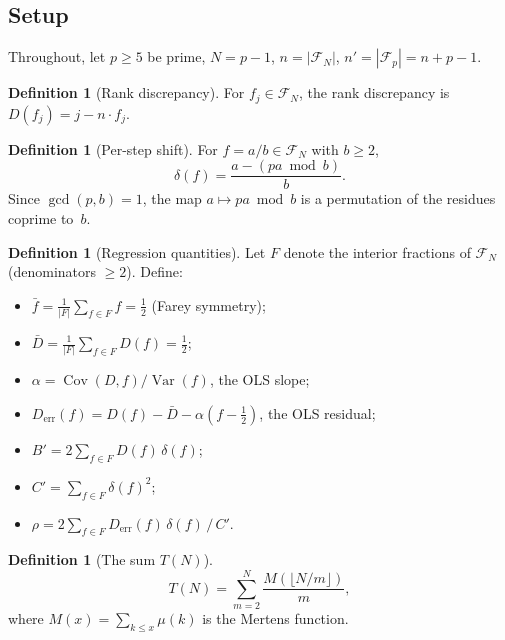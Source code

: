 \documentclass[11pt]{article}
\theoremstyle{definition}
\newtheorem{definition}[theorem]{Definition}
\newcommand{\F}{\mathcal{F}}
\DeclareMathOperator{\Cov}{Cov}
\DeclareMathOperator{\Var}{Var}
\begin{document}
\subsection{Setup}

Throughout, let $p \ge 5$ be prime, $N = p - 1$, $n = |\F_N|$,
$n' = |\F_p| = n + p - 1$.

\begin{definition}[Rank discrepancy]
For $f_j \in \F_N$, the rank discrepancy is
$D(f_j) = j - n \cdot f_j$.
\end{definition}

\begin{definition}[Per-step shift]
For $f = a/b \in \F_{N}$ with $b \ge 2$,
\begin{equation}\label{eq:shift}
  \delta(f) = \frac{a - (pa \bmod b)}{b}.
\end{equation}
Since $\gcd(p,b) = 1$, the map $a \mapsto pa \bmod b$ is a
permutation of the residues coprime to~$b$.
\end{definition}

\begin{definition}[Regression quantities]
Let $F$ denote the interior fractions of $\F_N$ (denominators $\ge 2$).
Define:
\begin{itemize}
  \item $\bar{f} = \frac{1}{|F|}\sum_{f \in F} f = \frac{1}{2}$
    (Farey symmetry);
  \item $\bar{D} = \frac{1}{|F|}\sum_{f \in F} D(f) = \frac{1}{2}$;
  \item $\alpha = \Cov(D, f)/\Var(f)$, the OLS slope;
  \item $D_{\mathrm{err}}(f) = D(f) - \bar{D} - \alpha(f - \tfrac{1}{2})$,
    the OLS residual;
  \item $B' = 2\sum_{f \in F} D(f)\,\delta(f)$;
  \item $C' = \sum_{f \in F} \delta(f)^2$;
  \item $\rho = 2\sum_{f \in F} D_{\mathrm{err}}(f)\,\delta(f) \,/\, C'$.
\end{itemize}
\end{definition}

\begin{definition}[The sum $T(N)$]
\begin{equation}\label{eq:T-def}
  T(N) = \sum_{m=2}^{N} \frac{M(\lfloor N/m \rfloor)}{m},
\end{equation}
where $M(x) = \sum_{k \le x} \mu(k)$ is the Mertens function.
\end{definition}
\end{document}
